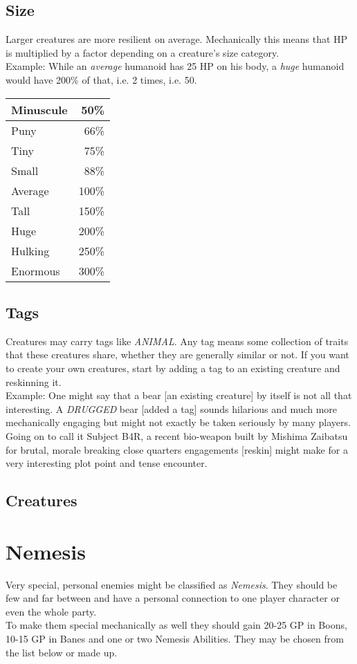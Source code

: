 \documentclass[12pt,a4paper,openany]{book}
\begin{document}
	\section{Size}
	Larger creatures are more resilient on average. Mechanically this means that HP is multiplied by a factor depending on a creature's size category.\\
	Example: While an \emph{average} humanoid has 25 HP on his body, a \emph{huge} humanoid would have 200\% of that, i.e. 2 times, i.e. 50.
	\begin{tabularx}{\textwidth}{|l|r|}
		\hline
		Minuscule &  50\% \\ \hline
		Puny      &  66\% \\ \hline
		Tiny      &  75\% \\ \hline
		Small     &  88\% \\ \hline
		Average   & 100\% \\ \hline
		Tall      & 150\% \\ \hline
		Huge      & 200\% \\ \hline
		Hulking   & 250\% \\ \hline
		Enormous  & 300\% \\ \hline
	\end{tabularx}
	
	\section{Tags}
	Creatures may carry tags like \emph{ANIMAL}. Any tag means some collection of traits that these creatures share, whether they are generally similar or not. If you want to create your own creatures, start by adding a tag to an existing creature and reskinning it.\\
	Example: One might say that a bear [an existing creature] by itself is not all that interesting. A \emph{DRUGGED} bear [added a tag] sounds hilarious and much more mechanically engaging but might not exactly be taken seriously by many players. Going on to call it Subject B4R, a recent bio-weapon built by Mishima Zaibatsu for brutal, morale breaking close quarters engagements [reskin] might make for a very interesting plot point and tense encounter.
	
	
	\section{Creatures}
	
	
	\chapter{Nemesis}
	Very special, personal enemies might be classified as \emph{Nemesis}. They should be few and far between and have a personal connection to one player character or even the whole party.\\
	To make them special mechanically as well they should gain 20-25 GP in Boons, 10-15 GP in Banes and one or two Nemesis Abilities. They may be chosen from the list below or made up.
\end{document}
